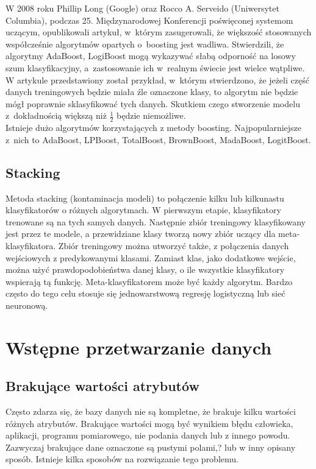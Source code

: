 W 2008 roku Phillip Long (Google) oraz Rocco A. Serveido (Uniwersytet Columbia), podczas 25. Międzynarodowej Konferencji poświęconej systemom uczącym, opublikowali artykuł, w którym zasugerowali, że większość stosowanych współcześnie algorytmów opartych o boosting jest wadliwa. Stwierdzili, że algorytmy AdaBoost, LogiBoost mogą wykazywać słabą odporność na losowy szum klasyfikacyjny, a zastosowanie ich w realnym świecie jest wielce wątpliwe. W artykule przedstawiony został przykład, w którym stwierdzono, że jeżeli część danych treningowych będzie miała źle oznaczone klasy, to algorytm nie będzie mógł poprawnie sklasyfikować tych danych. Skutkiem czego stworzenie modelu z dokładnością większą niż $\frac{1}{2}$ będzie niemożliwe. \\
Istnieje dużo algorytmów korzystających z metody boosting. Najpopularniejsze z nich to AdaBoost, LPBoost, TotalBoost, BrownBoost, MadaBoost, LogitBoost.
\subsection{Stacking}
Metoda stacking (kontaminacja modeli) to połączenie kilku lub kilkunastu klasyfikatorów o różnych algorytmach. W pierwszym etapie, klasyfikatory trenowane są na tych samych danych. Następnie zbiór treningowy klasyfikowany jest przez te modele, a przewidziane klasy tworzą nowy zbiór uczący dla meta-klasyfikatora. Zbiór treningowy można utworzyć także, z połączenia danych wejściowych z predykowanymi klasami. Zamiast klas, jako dodatkowe wejście, można użyć prawdopodobieństwa danej klasy, o ile wszystkie klasyfikatory wspierają tą funkcję. Meta-klasyfikatorem może być każdy algorytm. Bardzo często do tego celu stosuje się jednowarstwową regresję logistyczną lub sieć neuronową. 
\section{Wstępne przetwarzanie danych}
\subsection{Brakujące wartości atrybutów}
Często zdarza się, że bazy danych nie są kompletne, że brakuje kilku wartości różnych atrybutów. Brakujące wartości mogą być wynikiem błędu człowieka, aplikacji, programu pomiarowego, nie podania danych lub z innego powodu. Zazwyczaj brakujące dane oznaczone są pustymi polami,? lub w inny opisany sposób. Istnieje kilka sposobów na rozwiązanie tego problemu.
